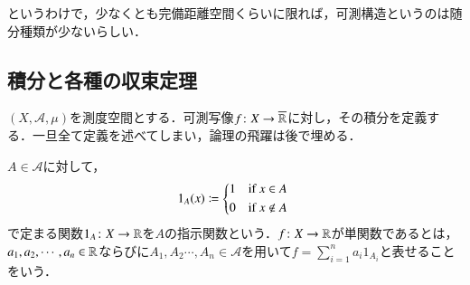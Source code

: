 というわけで，少なくとも完備距離空間くらいに限れば，可測構造というのは随分種類が少ないらしい．

\subsection{積分と各種の収束定理}

$(X,\mathcal{A},\mu)$を測度空間とする．可測写像$f \colon X \to \overline{\mathbb{R}}$に対し，その積分を定義する．一旦全て定義を述べてしまい，論理の飛躍は後で埋める．

\begin{defi}
$A \in \mathcal{A}$に対して，
\begin{equation}
1_A(x) \coloneqq \begin{dcases*}
    1 & if $x \in A$ \\
    0 & if $x \notin A$
  \end{dcases*}
\end{equation}で定まる関数$1_A \colon X \to \mathbb{R}$を$A$の指示関数という．$f \colon X \to \mathbb{R}$が単関数であるとは，$a_1, a_2, \cdots, a_n \in \mathbb{R}$ならびに$A_1, A_2 \cdots, A_n \in \mathcal{A}$を用いて$f = \sum_{i=1}^n a_i 1_{A_i}$と表せることをいう．
\end{defi}

